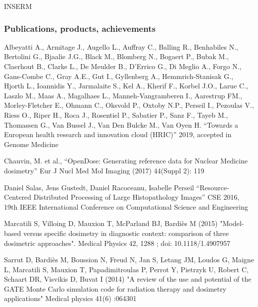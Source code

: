 \begin{sitedescription}{INSERM}

\subsubsection*{Publications, products, achievements}
\begin{compactenum}
\item Albeyatti A., Armitage J., Augello L., Auffray C., Balling R., Benhabiles
  N., Bertolini G., Bjaalie J.G., Black M., Blomberg N., Bogaert P., Bubak M.,
  Claerhout B., Clarke L., De Meulder B., D'Errico G., Di Meglio A., Forgo N.,
  Gans-Combe C., Gray A.E., Gut I., Gyllenberg A., Hemmrich-Stanisak G., Hjorth
  L., Ioannidis Y., Jarmalaite S., Kel A., Kherif F., Korbel J.O., Larue C.,
  Laszlo M., Maas A., Magalhaes L., Manneh-Vangramberen I., Aarestrup FM.,
  Morley-Fletcher E., Ohmann C., Oksvold P., Oxtoby N.P., Perseil I., Pezoulas
  V., Riess O., Riper H., Roca J., Rosentiel P., Sabatier P., Sanz F., Tayeb
  M., Thomassen G., Van Bussel J., Van Den Bulcke M., Van Oyen H. “Towards a
  European health research and innovation cloud (HRIC)” 2019, accepted in
  Genome Medicine
  
\item Chauvin, M. et al., “OpenDose: Generating reference data for Nuclear
  Medicine dosimetry” Eur J Nucl Med Mol Imaging (2017) 44(Suppl 2): 119
  
\item Daniel Salas, Jens Gustedt, Daniel Racoceanu, Isabelle Perseil
  “Resource-Centered Distributed Processing of Large Histopathology Images” CSE
  2016, 19th IEEE International Conference on Computational Science and
  Engineering
  
\item Marcatili S, Villoing D, Mauxion T, McParland BJ, Bardi\`es M (2015)
  "Model-based versus specific dosimetry in diagnostic context: comparison of
  three dosimetric approaches". Medical Physics 42, 1288 ; doi:
  10.1118/1.4907957
  
\item Sarrut D, Bardi\`es M, Boussion N, Freud N, Jan S, Letang JM, Loudos G,
  Maigne L, Marcatili S, Mauxion T, Papadimitroulas P, Perrot Y, Pietrzyk U,
  Robert C, Schaart DR, Visvikis D, Buvat I (2014) "A review of the use and
  potential of the GATE Monte Carlo simulation code for radiation therapy and
  dosimetry applications" Medical physics 41(6) :064301
  

\end{compactenum}
\end{sitedescription}
